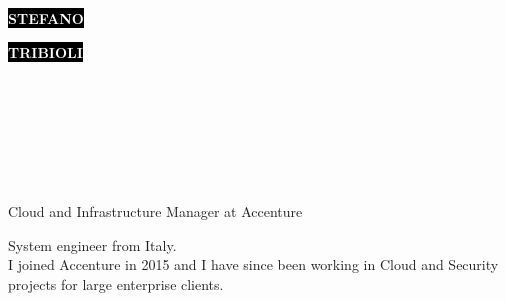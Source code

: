 \documentclass[9pt]{developercv}
\begin{document}
\begin{minipage}[t]{0.42\textwidth}
	\vspace{-\baselineskip}
	
	\colorbox{black}{{\HUGE\textcolor{white}{\textbf{\MakeUppercase{Stefano}}}}}
	
	\colorbox{black}{{\HUGE\textcolor{white}{\textbf{\MakeUppercase{Tribioli}}}}}
\end{minipage}
\begin{minipage}[t]{0.29\textwidth}
	\vspace{-\baselineskip}
	
	\\
	\\	
\end{minipage}
\begin{minipage}[t]{0.29\textwidth}
	\vspace{-\baselineskip}
	
	\\
	\\
	\\
\end{minipage}

\begin{minipage}[t]{1\textwidth}
\vspace{6pt}
\LARGE Cloud and Infrastructure Manager at Accenture
\end{minipage}


\begin{minipage}[t]{1\textwidth}
	\vspace{-\baselineskip}
	System engineer from Italy.
	\\
	I joined Accenture in 2015 and I have since been working in Cloud and Security projects for large enterprise clients.
\end{minipage}

\end{document}
